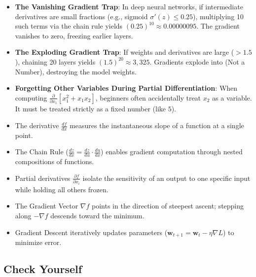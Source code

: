 \begin{warning}
\begin{itemize}
    \item \textbf{The Vanishing Gradient Trap}: In deep neural networks, if intermediate derivatives are small fractions (e.g., sigmoid $\sigma'(z) \le 0.25$), multiplying 10 such terms via the chain rule yields $(0.25)^{10} \approx 0.00000095$. The gradient vanishes to zero, freezing earlier layers.
    \item \textbf{The Exploding Gradient Trap}: If weights and derivatives are large ($> 1.5$), chaining 20 layers yields $(1.5)^{20} \approx 3{,}325$. Gradients explode into  (Not a Number), destroying the model weights.
    \item \textbf{Forgetting Other Variables During Partial Differentiation}: When computing $\frac{\partial}{\partial x_1}[x_1^2 + x_1 x_2]$, beginners often accidentally treat $x_2$ as a variable. It must be treated strictly as a fixed number (like $5$).
\end{itemize}
\end{warning}

\begin{takeaways}
\begin{itemize}
    \item The derivative $\frac{df}{dx}$ measures the instantaneous slope of a function at a single point.
    \item The Chain Rule ($\frac{dz}{dx} = \frac{dz}{du} \cdot \frac{du}{dx}$) enables gradient computation through nested compositions of functions.
    \item Partial derivatives $\frac{\partial f}{\partial x_i}$ isolate the sensitivity of an output to one specific input while holding all others frozen.
    \item The Gradient Vector $\nabla f$ points in the direction of steepest ascent; stepping along $-\nabla f$ descends toward the minimum.
    \item Gradient Descent iteratively updates parameters ($\mathbf{w}_{t+1} = \mathbf{w}_t - \eta \nabla L$) to minimize error.
\end{itemize}
\end{takeaways}

\subsection{Check Yourself}

